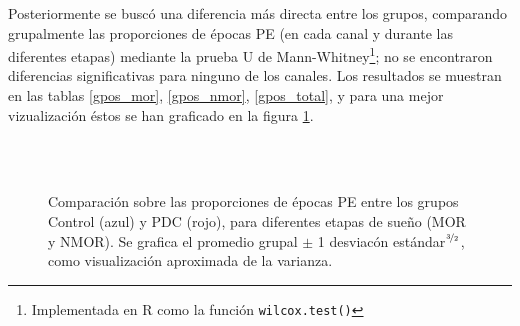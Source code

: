 \documentclass[12pt,a4paper]{mitthesis}
\begin{document}
Posteriormente se busc\'o una diferencia m\'as directa entre los grupos, comparando grupalmente las 
proporciones de \'epocas PE (en cada canal y durante las diferentes etapas)
mediante la prueba U de Mann-Whitney\footnote{Implementada en R como la funci\'on 
\texttt{wilcox.test()}};
no se encontraron diferencias significativas para ninguno de los canales. Los resultados se 
muestran en las tablas \ref{gpos_mor}, \ref{gpos_nmor}, \ref{gpos_total}, y para una mejor 
vizualizaci\'on \'estos se han graficado en la figura \ref{comparacion_graf}.

\begin{figure}
\centering
{}\\
\\
\caption{Comparaci\'on sobre las proporciones de \'epocas PE entre los grupos Control (azul) y PDC 
(rojo), para diferentes etapas de sue\~no (MOR y NMOR). Se grafica el promedio grupal $\pm$ 1 
desviac\'on est\'andar$^{\nicefrac{3}{2}}$, como visualizaci\'on aproximada de la varianza.}
\label{comparacion_graf}
\end{figure}
\end{document}
